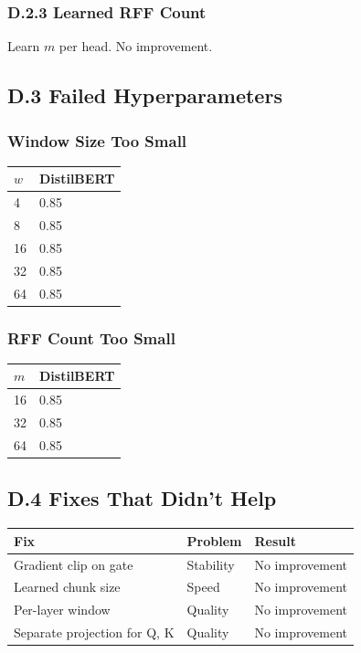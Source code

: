 \subsubsection{D.2.3 Learned RFF Count}

Learn $m$ per head. No improvement.

\subsection{D.3 Failed Hyperparameters}

\subsubsection{Window Size Too Small}
\begin{table}[H]
\centering
\small
\begin{tabular}{ll}
\toprule
\textbf{$w$} & \textbf{DistilBERT} \\
\midrule
4 & 0.85 \\
8 & 0.85 \\
16 & 0.85 \\
32 & 0.85 \\
64 & 0.85 \\
\bottomrule
\end{tabular}
\end{table}

\subsubsection{RFF Count Too Small}
\begin{table}[H]
\centering
\small
\begin{tabular}{ll}
\toprule
\textbf{$m$} & \textbf{DistilBERT} \\
\midrule
16 & 0.85 \\
32 & 0.85 \\
64 & 0.85 \\
\bottomrule
\end{tabular}
\end{table}

\subsection{D.4 Fixes That Didn't Help}

\begin{table}[H]
\centering
\small
\begin{tabular}{lll}
\toprule
\textbf{Fix} & \textbf{Problem} & \textbf{Result} \\
\midrule
Gradient clip on gate & Stability & No improvement \\
Learned chunk size & Speed & No improvement \\
Per-layer window & Quality & No improvement \\
Separate projection for Q, K & Quality & No improvement \\
\bottomrule
\end{tabular}
\end{table}

